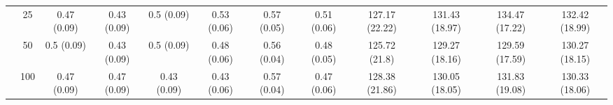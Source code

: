 \documentclass[10pt]{article}
\theoremstyle{definition}
\begin{document}
\begin{table}[H]
\begin{center}
{\begin{tabular}{cc|ccc|ccc|cccc|}
    & 25  & 0.47 (0.09) & 0.43 (0.09) & 0.5 (0.09) & 0.53 (0.06) & 0.57 (0.05) & 0.51 (0.06) & 127.17 (22.22) & 131.43 (18.97) & 134.47 (17.22) & 132.42 (18.99) \\ 
    & 50  & 0.5 (0.09) & 0.43 (0.09) & 0.5 (0.09) & 0.48 (0.06) & 0.56 (0.04) & 0.48 (0.05) & 125.72 (21.8) & 129.27 (18.16) & 129.59 (17.59) & 130.27 (18.15) \\ 
    & 100  & 0.47 (0.09) & 0.47 (0.09) & 0.43 (0.09) & 0.43 (0.06) & 0.57 (0.04) & 0.47 (0.06) & 128.38 (21.86) & 130.05 (18.05) & 131.83 (19.08) & 130.33 (18.06) \\
\end{tabular}}
   \end{center}
      \vspace{-.5cm}
\end{table}
\end{document}

